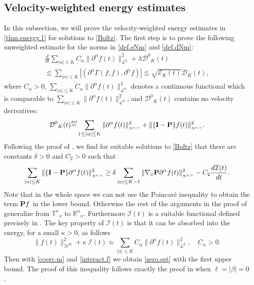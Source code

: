 \documentclass{amsart}
\numberwithin{equation}{section}
\begin{document}
\subsection{Velocity-weighted energy estimates}\label{sec:vwee}
In this subsection, we will prove the velocity-weighted energy estimates in \eqref{thm.energy.1} for solutions to \eqref{Boltz}. The first step is to prove the following unweighted estimate for the norms in \eqref{def.eNm} and \eqref{def.dNm}:
\begin{multline}  
\label{zero.est}
\frac{d}{dt}\sum_{|{\alpha}|\leq {K}}C_{\alpha} \|{\partial}^{\alpha} {f}(t)\|_{{\mathcal{L}}^2}^2
+
{\lambda} {{\mathcal{D}}^0}_{K}(t)
\\ 
\lesssim 
\sum_{|{\alpha}| \leq {K}} \left| \left( {\partial}^{\alpha} {\Gamma}(f,f), {\partial}^{\alpha} f \right) \right|
\lesssim 
\sqrt{{\mathcal{E}}_{K}(t)} {\mathcal{D}}_{K}(t),
\end{multline}  
where $C_\alpha >0$, $\sum_{|{\alpha}|\leq {K}}C_{\alpha} \|{\partial}^{\alpha} {f}(t)\|_{{\mathcal{L}}^2}^2$ denotes a continuous functional which is comparable to $\sum_{|{\alpha}|\leq {K}} \|{\partial}^{\alpha} {f}(t)\|_{{\mathcal{L}}^2}^2$, and ${{\mathcal{D}}^0}_{K}(t)$ contains no velocity derivatives:
\begin{equation}
\label{dk.no.be}
{{\mathcal{D}}^0}_{K}(t)
{\overset{\mbox{\tiny{def}}}{=}}
 \sum_{1\le |{\alpha}| \leq {K}}   \| \partial^\alpha {f}(t) \|_{_{N^{s,\gamma}}}^2 
+
 \| \{ {\bf I - P } \} {f}(t) \|_{_{N^{s,\gamma}}}^2. 
\end{equation}
Following the proof of \cite[Theorem 8.4]{gsNonCut0}, we find for suitable solutions to \eqref{Boltz} that there are constants $\delta>0$ and $C_2>0$ such that
\begin{equation}
\sum_{|\alpha| \le {K}} \| \{ {\bf I - P } \} \partial^\alpha {f}(t) \|_{_{N^{s,\gamma}}}^2
\ge 
\delta
\sum_{|\alpha| \le {K}-1} \| \nabla_x{ \bf  P  } \partial^\alpha {f}(t) \|_{_{N^{s,\gamma}}}^2 - C_2\frac{d\mathcal{I}(t)}{dt}.
\label{coerc.m}
\end{equation}
Note that in the whole space we can not use the Poincar{\'e} inequality to obtain the term ${ \bf  P  }f$ in the lower bound.  
Otherwise the rest of the arguments in the proof of \cite[Theorem 8.4]{gsNonCut0} generalize from ${\mathbb{T}^{n}}_x$ to ${{\mathbb R}^{n}}_x$.  Furthermore $\mathcal{I}(t)$ is a suitable functional defined precisely in \cite[(8.25)]{gsNonCut0}.  The key property of $\mathcal{I}(t)$ is that it can be absorbed into the energy, for a small $\kappa >0$, as follows
\begin{equation}
 \|{f}(t)\|_{{\mathcal{H}}^{K}}^2+{\kappa}~  \mathcal{I}(t) \approx \sum_{|{\alpha}|\leq {K}}C_{\alpha} \|{\partial}^{\alpha} {f}(t)\|_{{\mathcal{L}}^2}^2,
 \quad C_{\alpha} > 0.
\label{interact.f}
\end{equation}
Then with \eqref{coerc.m} and \eqref{interact.f} we obtain \eqref{zero.est} with the first upper bound. The proof of this inequality follows exactly the proof in \cite[(8.26)]{gsNonCut0} when $\ell = |\beta| =0$.
\end{document}
